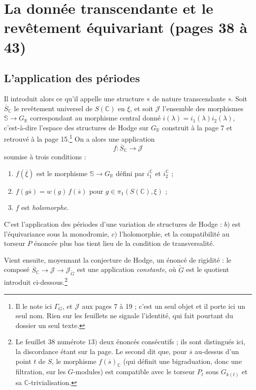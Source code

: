 \documentclass[11pt,a4paper]{article}
\begin{document}
\section*{La donnée transcendante et le revêtement équivariant (pages 38 à 43)}

\subsection*{L'application des périodes}

Il introduit alors ce qu'il appelle une structure « de nature transcendante ».
Soit $\overline{S}_{\mathbb{C}}$ le revêtement universel de $S(\mathbb{C})$ en
$\xi$, et soit $\mathcal{J}$ l'ensemble des morphismes $\mathbb{S} \to
G_{\mathbb{R}}$ correspondant au morphisme central donné
$i(\lambda) = i_{1}(\lambda) i_{2}(\lambda)$, c'est-à-dire
l'espace des structures de Hodge sur $G_{\mathbb{R}}$ construit à la page 7 et
retrouvé à la page 15.\footnote{Il le note ici $\Gamma_{G}$, et $\mathcal{J}$ aux
pages 7 à 19 ; c'est un seul objet et il porte ici un seul nom. Rien sur les
feuillets ne signale l'identité, qui fait pourtant du dossier un seul
texte.} On a alors une application
\[
f : \overline{S}_{\mathbb{C}} \longrightarrow \mathcal{J}
\]
soumise à trois conditions :

\begin{enumerate}
  \item[$a)$] $f(\overline{\xi})$ est le morphisme $\mathbb{S} \to
  G_{\mathbb{R}}$ défini par $i^{\mathbb{C}}_{1}$ et $i^{\mathbb{C}}_{2}$ ;
  \item[$b)$] $f(g \overline{s}) = w(g)\, f(\overline{s})$ pour
  $g \in \pi_{1}(S(\mathbb{C}), \xi)$ ;
  \item[$c)$] $f$ est \emph{holomorphe}.
\end{enumerate}

C'est l'application des périodes d'une variation de structures de Hodge : $b)$
est l'équivariance sous la monodromie, $c)$ l'holomorphie, et la compatibilité
au torseur $P$ énoncée plus bas tient lieu de la condition de transversalité.

Vient ensuite, moyennant la conjecture de Hodge, un énoncé de rigidité : le
composé $\overline{S}_{\mathbb{C}} \to \mathcal{J} \to \mathcal{J}_{\widetilde{G}}$
est une application \emph{constante}, où $\widetilde{G}$ est le quotient
introduit ci-dessous.\footnote{Le feuillet 38 numérote $13)$ deux énoncés
consécutifs ; ils sont distingués ici, la discordance étant sur la page. Le
second dit que, pour $\overline{s}$ au-dessus d'un point $t$ de $S$, le morphisme
$f(\overline{s})_{\mathbb{C}}$ (qui définit une bigraduation, donc une
filtration, sur les $G$-modules) est compatible avec le torseur $P_{t}$ sous
$G_{k(t)}$ et sa $\mathbb{C}$-trivialisation.}
\end{document}
